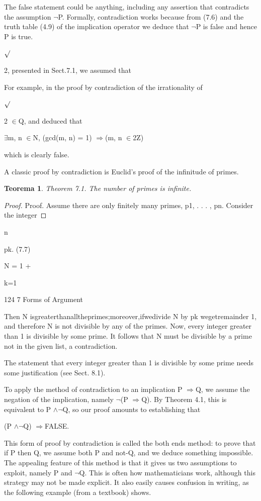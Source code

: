 \documentclass[11pt]{article}
\theoremstyle{plain}
\newtheorem{theorem}{Teorema}[section]
\theoremstyle{definition}
\begin{document}
The false statement could be anything, including any assertion that contradicts the assumption $\neg$P. Formally, contradiction works because from (7.6) and the truth table (4.9) of the implication operator we deduce that $\neg$P is false and hence P is true.

$\surd$

2, presented in Sect.7.1, we assumed that

For example, in the proof by contradiction of the irrationality of

$\surd$

2 $\in$Q, and deduced that

$\exists$m, n $\in$N, (gcd(m, n) = 1) $\Rightarrow$(m, n $\in$2Z)

which is clearly false.

A classic proof by contradiction is Euclid's proof of the infinitude of primes.

\begin{theorem}
Theorem 7.1. The number of primes is infinite.
\end{theorem}

\begin{proof}
Proof. Assume there are only finitely many primes, p1, . . . , pn. Consider the integer
\end{proof}

n

pk. (7.7)

N = 1 +

k=1

124 7 Forms of Argument

Then N isgreaterthanalltheprimes;moreover,ifwedivide N by pk wegetremainder 1, and therefore N is not divisible by any of the primes. Now, every integer greater than 1 is divisible by some prime. It follows that N must be divisible by a prime not in the given list, a contradiction. 

The statement that every integer greater than 1 is divisible by some prime needs some justification (see Sect. 8.1).

To apply the method of contradiction to an implication P $\Rightarrow$Q, we assume the negation of the implication, namely $\neg$(P $\Rightarrow$Q). By Theorem 4.1, this is equivalent to P $\land$$\neg$Q, so our proof amounts to establishing that

(P $\land$$\neg$Q) $\Rightarrow$FALSE.

This form of proof by contradiction is called the both ends method: to prove that if P then Q, we assume both P and not-Q, and we deduce something impossible. The appealing feature of this method is that it gives us two assumptions to exploit, namely P and $\neg$Q. This is often how mathematicians work, although this strategy may not be made explicit. It also easily causes confusion in writing, as the following example (from a textbook) shows.
\end{document}
